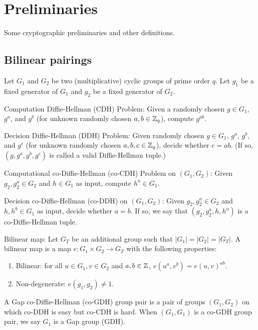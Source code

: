 \chapter{Preliminaries}

Some cryptographic preliminaries and other definitions.

\newpage

\section{Bilinear pairings}
\cite{DiHe76}

Let $G_1$ and $G_2$ be two (multiplicative) cyclic groups of prime order $q$. Let $g_1$ be a fixed generator of $G_1$ and $g_2$ be a fixed generator of $G_2$.

 Computation Diffie-Hellman (CDH) Problem: Given a randomly chosen $g \in G_1$, $g^a$, and $g^b$ (for unknown randomly chosen $a,b \in {\mathbb Z}_q$), compute $g^{ab}$.

 Decision Diffie-Hellman (DDH) Problem: Given randomly chosen $g \in G_1$, $g^a$, $g^b$, and $g^c$ (for unknown randomly chosen $a,b,c \in {\mathbb Z}_q$), decide whether $c = ab$. (If so, $(g, g^a, g^b, g^c)$ is called a valid Diffie-Hellman tuple.)

 Computational co-Diffie-Hellman (co-CDH) Problem on $(G_1, G_2)$: Given $g_2, g^a_2 \in G_2$ and $h \in G_1$ as input, compute $h^a \in G_1$.

 Decision co-Diffie-Hellman (co-DDH) on $(G_1, G_2)$: Given $g_2, g^a_2 \in G_2$ and $h, h^b \in G_1$ as input, decide whether $a=b$. If so, we say that $(g_2, g^a_2, h, h^a)$ is a co-Diffie-Hellman tuple.

 Bilinear map: Let $G_T$ be an additional group such that $ |G_1| = |G_2| = |G_T| $. A bilinear map is a map $e: G_1 \times G_2 \rightarrow G_T$ with the following properties:
\begin{enumerate}

\item Bilinear: for all $u \in G_1, v \in G_2$ and $a,b \in {\mathbb Z}$, $e(u^a, v^b) = e(u,v)^{ab}$.
\item Non-degenerate: $e(g_1, g_2) \neq 1$.

\end{enumerate}

 A Gap co-Diffie-Hellman (co-GDH) group pair is a pair of groups $(G_1, G_2)$ on which co-DDH is easy but co-CDH is hard. When $(G_1, G_1)$ is a co-GDH group pair, we say $G_1$ is a Gap group (GDH).

